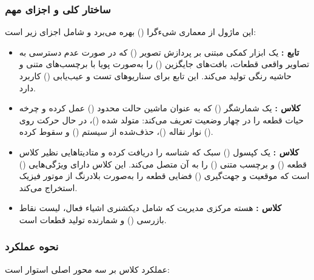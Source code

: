 \documentclass{article}
\begin{document}
\subsubsection{ساختار کلی و اجزای مهم}
این ماژول از معماری شیءگرا () بهره می‌برد و شامل اجزای زیر است:

\begin{itemize}
	\item \textbf{تابع :} یک ابزار کمکی مبتنی بر پردازش تصویر () که در صورت عدم دسترسی به تصاویر واقعی قطعات، بافت‌های جایگزین () را به‌صورت پویا با برچسب‌های متنی و حاشیه رنگی تولید می‌کند. این تابع برای سناریوهای تست و عیب‌یابی () کاربرد دارد.
	\item \textbf{کلاس :} یک شمارشگر () که به عنوان ماشین حالت محدود () عمل کرده و چرخه حیات قطعه را در چهار وضعیت تعریف می‌کند: متولد شده ()، در حال حرکت روی نوار نقاله ()، حذف‌شده از سیستم () و سقوط کرده ().
	\item \textbf{کلاس :} یک کپسول () سبک که شناسه  را دریافت کرده و متادیتاهایی نظیر کلاس قطعه () و برچسب متنی () را به آن متصل می‌کند. این کلاس دارای ویژگی‌هایی () است که موقعیت و جهت‌گیری () فضایی قطعه را به‌صورت بلادرنگ از موتور فیزیک استخراج می‌کند.
	\item \textbf{کلاس :} هسته مرکزی مدیریت که شامل دیکشنری اشیاء فعال، لیست نقاط بازرسی () و شمارنده تولید قطعات است.
\end{itemize}

\subsubsection{نحوه عملکرد}
عملکرد کلاس  بر سه محور اصلی استوار است:
\end{document}
